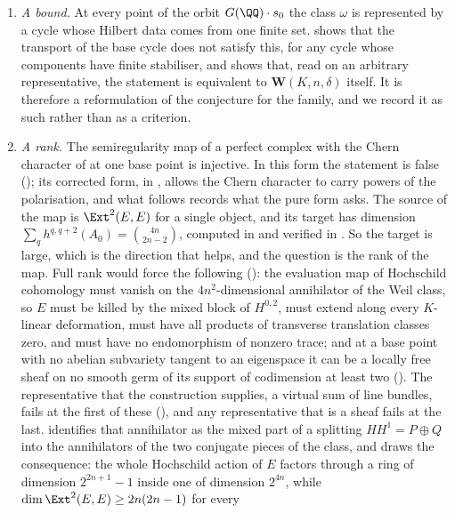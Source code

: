 \begin{remark}
\begin{enumerate}[label=\textup{(P\arabic*)},leftmargin=*]
\item \emph{A bound.} At every point of the orbit $G(\QQ)\cdot s_{0}$ the
  class $\omega$ is represented by a cycle whose Hilbert data comes from one
  finite set.  shows that the transport of the base cycle
  does not satisfy this, for any cycle whose components have finite
  stabiliser, and  shows that, read on an arbitrary
  representative, the statement is equivalent to $\mathbf{W}(K,n,\delta)$
  itself. It is therefore a reformulation of the conjecture for the family,
  and we record it as such rather than as a criterion.
\item \emph{A rank.} The semiregularity map of a perfect complex with the
  Chern character of  at one base point is injective.
  In this form the statement is false (); its corrected
  form, in , allows the Chern character to carry powers of
  the polarisation, and what follows records what the pure form asks. The
  source of the map is $\Ext^{2}(E,E)$ for a single object, and its target
  has dimension $\sum_{q}h^{q,q+2}(A_{0})=\binom{4n}{2n-2}$, computed in
   and verified in \cite{BMB26}. So the target is large, which is the direction that
  helps, and the question is the rank of the map. Full rank would force the
  following (): the evaluation map of
  Hochschild cohomology must vanish on the $4n^{2}$-dimensional annihilator of
  the Weil class, so $E$ must be killed by the mixed block of $H^{0,2}$, must
  extend along every $K$-linear deformation, must have all products of
  transverse translation classes zero, and must have no endomorphism of
  nonzero trace; and at a base point with no abelian subvariety tangent to an
  eigenspace it can be a locally free sheaf on no smooth germ of its support
  of codimension at least two (). The representative that
  the construction supplies, a virtual sum of line bundles, fails at the first
  of these (), and any representative that is a
  sheaf fails at the last.  identifies that
  annihilator as the mixed part of a splitting $HH^{1}=P\oplus Q$ into the
  annihilators of the two conjugate pieces of the class, and
   draws the consequence: the whole Hochschild action of
  $E$ factors through a ring of dimension $2^{2n+1}-1$ inside one of
  dimension $2^{4n}$, while $\dim\Ext^{2}(E,E)\ge2n(2n-1)$ for every

\end{enumerate}
\end{remark}
